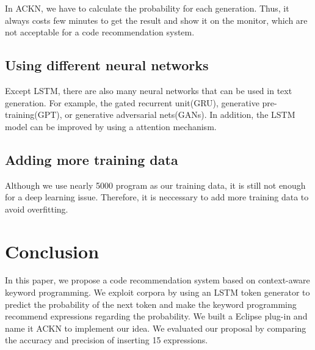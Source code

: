 \documentclass[PRO,english]{ipsj}
\begin{document}
In ACKN, we have to calculate the probability for each generation. Thus, it always costs few minutes to get the result and show it on the monitor, which are not acceptable for a code recommendation system. 


\subsection{Using different neural networks}
Except LSTM, there are also many neural networks that can be used in text generation. For example, the gated recurrent unit(GRU), generative pre-training(GPT), or generative adversarial nets(GANs). In addition, the LSTM model can be improved by using a attention mechanism. 

\subsection{Adding more training data}
Although we use nearly 5000 program as our training data, it is still not enough for a deep learning issue. Therefore, it is neccessary to add more training data to avoid overfitting.



\section{Conclusion}

In this paper, we propose a code recommendation system based on context-aware keyword programming. We exploit corpora by using an LSTM token generator to predict the probability of the next token and make the keyword programming recommend expressions regarding the probability. We built a Eclipse plug-in and name it ACKN to implement our idea. We evaluated our proposal by comparing the accuracy and precision of inserting 15 expressions. 





\end{document}
